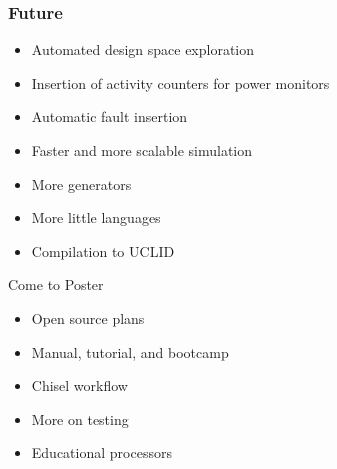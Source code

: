 \documentclass[xcolor=pdflatex,dvipsnames,table]{beamer}
\begin{document}
\ifx\poster\undefined
\begin{frame}[fragile]
\frametitle{Future}

\begin{itemize}
\item Automated design space exploration
\item Insertion of activity counters for power monitors
\item Automatic fault insertion
\item Faster and more scalable simulation
\item More generators
\item More little languages
\item Compilation to UCLID
\end{itemize}

\end{frame}
\fi

\ifx\poster\undefined
\begin{frame}[fragile]{Come to Poster}

\begin{itemize}
\item Open source plans
\item Manual, tutorial, and bootcamp
\item Chisel workflow
\item More on testing
\item Educational processors
\end{itemize}

\end{frame}
\fi
\end{document}
